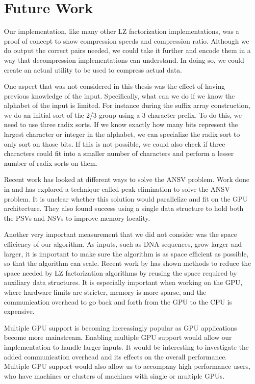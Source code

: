 \chapter{Future Work}
\label{chap:futurework}

Our implementation, like many other LZ factorization implementations, was a proof of concept to show compression speeds and compression ratio.
Although we do output the correct pairs needed, we could take it further and encode them in a way that decompression implementations can understand.
In doing so, we could create an actual utility to be used to compress actual data.

One aspect that was not considered in this thesis was the effect of having previous knowledge of the input.
Specifically, what can we do if we know the alphabet of the input is limited.
For instance during the suffix array construction, we do an initial sort of the 2/3 group using a 3 character prefix.
To do this, we need to use three radix sorts.
If we know exactly how many bits represent the largest character or integer in the alphabet, we can specialize the radix sort to only sort on those bits.
If this is not possible, we could also check if three characters could fit into a smaller number of characters and perform a lesser number of radix sorts on them.

Recent work has looked at different ways to solve the ANSV problem.
Work done in \cite{crochemore2008computing} and \cite{goto2013simpler} has explored a technique called peak elimination to solve the ANSV problem.
It is unclear whether this solution would parallelize and fit on the GPU architecture.
They also found success using a single data structure to hold both the PSVs and NSVs to improve memory locality.

Another very important measurement that we did not consider was the space efficiency of our algorithm.
As inputs, such as DNA sequences, grow larger and larger, it is important to make sure the algorithm is as space efficient as possible, so that the algorithm can scale.
Recent work by \cite{goto2014space} has shown methods to reduce the space needed by LZ factorization algorithms by reusing the space required by auxiliary data structures.
It is especially important when working on the GPU, where hardware limits are stricter, memory is more sparse, and the communication overhead to go back and forth from the GPU to the CPU is expensive.

Multiple GPU support is becoming increasingly popular as GPU applications become more mainstream.
Enabling multiple GPU support would allow our implementation to handle larger inputs.
It would be interesting to investigate the added communication overhead and its effects on the overall performance.
Multiple GPU support would also allow us to accompany high performance users, who have machines or clusters of machines with single or multiple GPUs.

